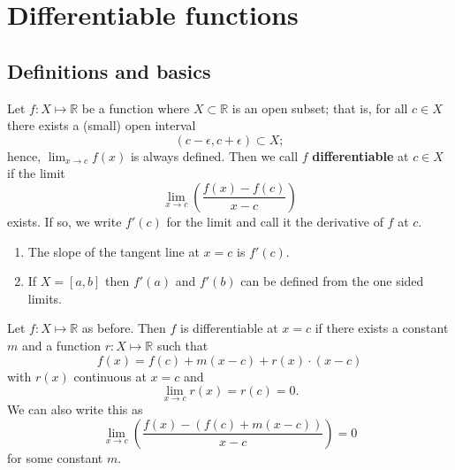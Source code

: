 \chapter{Differentiable functions}

\section{Definitions and basics}

\begin{definition}
    Let $f : X \mapsto \mathbb{R}$ be a function where $X \subset \mathbb{R}$ is an open subset; that is, for all $c \in X$ there exists a (small) open interval \[ (c - \epsilon, c + \epsilon) \subset X; \] hence, $\lim_{x \to c} f(x)$ is always defined. Then we call $f$ \textbf{differentiable} at $c \in X$ if the limit \[ \lim_{x \to c} \left( \dfrac{f(x) - f(c)}{x - c} \right) \] exists. If so, we write $f'(c)$ for the limit and call it the derivative of $f$ at $c$.
\end{definition}

\begin{remark}
    \begin{enumerate}
        \item The slope of the tangent line at $x = c$ is $f'(c)$.
        \item If $X = [a, b]$ then $f'(a)$ and $f'(b)$ can be defined from the one sided limits.
    \end{enumerate}
\end{remark}

\begin{lemma}
    Let $f : X \mapsto \mathbb{R}$ as before. Then $f$ is differentiable at $x = c$ if there exists a constant $m$ and a function $r : X \mapsto \mathbb{R}$ such that \[ f(x) = f(c) + m(x - c) + r(x) \cdot (x - c) \tag{$\star$} \] with $r(x)$ continuous at $x = c$ and \[ \lim_{x \to c} r(x) = r(c) = 0. \tag{$\star\star$} \] We can also write this as \[ \lim_{x \to c} \left( \dfrac{f(x) - (f(c) + m(x-c))}{x - c} \right) = 0 \] for some constant $m$.
\end{lemma}

